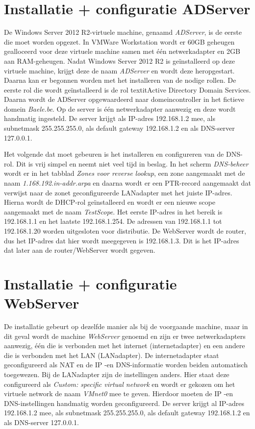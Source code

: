 \documentclass[pdftex,a4paper,12pt]{report}
\begin{document}
\section{Installatie + configuratie ADServer}
De Windows Server 2012 R2-virtuele machine, genaamd \textit{ADServer}, is de eerste die moet worden opgezet. In VMWare Workstation wordt er 60GB geheugen gealloceerd voor deze virtuele machine samen met één netwerkadapter en 2GB aan RAM-geheugen. Nadat Windows Server 2012 R2 is geïnstalleerd op deze virtuele machine, krijgt deze de naam \textit{ADServer} en wordt deze heropgestart. Daarna kan er begonnen worden met het installeren van de nodige rollen. De eerste rol die wordt geïnstalleerd is de rol textit{Active Directory Domain Services}. Daarna wordt de ADServer opgewaardeerd naar domeincontroller in het fictieve domein \textit{Baele.be}. Op de server is één netwerkadapter aanwezig en deze wordt handmatig ingesteld. De server krijgt als IP-adres 192.168.1.2 mee, als subnetmask 255.255.255.0, als default gateway 192.168.1.2 en als DNS-server 127.0.0.1. \newline

Het volgende dat moet gebeuren is het installeren en configureren van de DNS-rol. Dit is vrij simpel en neemt niet veel tijd in beslag. In het scherm \textit{DNS-beheer} wordt er in het tabblad \textit{Zones voor reverse lookup}, een zone aangemaakt met de naam\textit{ 1.168.192.in-addr.arpa} en daarna wordt er een PTR-record aangemaakt dat verwijst naar de zonet geconfigureerde LANadapter met het juiste IP-adres. Hierna wordt de DHCP-rol geïnstalleerd en wordt er een nieuwe scope aangemaakt met de naam \textit{TestScope}. Het eerste IP-adres in het bereik is 192.168.1.1 en het laatste 192.168.1.254. De adressen van 192.168.1.1 tot 192.168.1.20 worden uitgesloten voor distributie. De WebServer wordt de router, dus het IP-adres dat hier wordt meegegeven is 192.168.1.3. Dit is het IP-adres dat later aan de router/WebServer wordt gegeven. \newline

\section{Installatie + configuratie WebServer}
De installatie gebeurt op dezelfde manier als bij de voorgaande machine, maar in dit geval wordt de machine \textit{WebServer} genoemd en zijn er twee netwerkadapters aanwezig, één die is verbonden met het internet (internetadapter) en een andere die is verbonden met het LAN (LANadapter). De internetadapter staat geconfigureerd als NAT en de IP -en DNS-informatie worden beiden automatisch toegewezen. Bij de LANadapter zijn de instellingen anders. Hier staat deze configureerd als \textit{Custom: specific virtual network} en wordt er gekozen om het virtuele network de naam \textit{VMnet0} mee te geven. Hierdoor moeten de IP -en DNS-instellingen handmatig worden geconfigureerd. De server krijgt al IP-adres 192.168.1.2 mee, als subnetmask 255.255.255.0, als default gateway 192.168.1.2 en als DNS-server 127.0.0.1. \newline 
\end{document}

